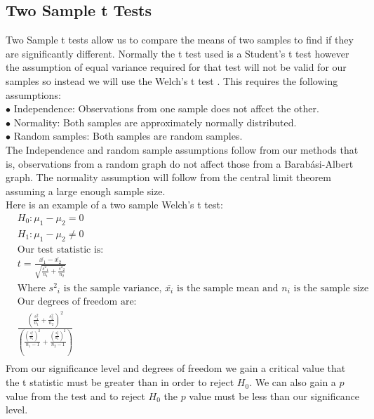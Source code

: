 \documentclass{article}
\begin{document}
        \subsection{Two Sample t Tests}
        Two Sample t tests allow us to compare the means of two samples to find if they are significantly different. Normally the t test used is a Student's t test however the assumption of equal variance required for that test will not be valid for our samples so instead we will use the Welch's t test \parencite{welch1947generalization}. This requires the following assumptions:\\
        $\bullet$ Independence: Observations from one sample does not affcet the other.\\
        $\bullet$ Normality: Both samples are approximately normally distributed.\\
        $\bullet$ Random samples: Both samples are random samples.\\
        The Independence and random sample assumptions follow from our methods that is, observations from a random graph do not affect those from a Barabási-Albert graph. The normality assumption will follow from the central limit theorem assuming a large enough sample size.\\
        Here is an example of a two sample Welch's t test:\\
        \begin{align*}
            &H_{0}: \mu_1 - \mu_2 = 0\\
            &H_{1}: \mu_1 - \mu_2 \neq  0\\
            &\text{Our test statistic is:}\\
            &t = \frac{\bar{x_1}-\bar{x_2} }{\sqrt{\frac{{s^2}_1}{n_1}+\frac{{s^2}_2}{n_2}}}\\
            &\text{Where ${s^2}_i$ is the sample variance, $\bar{x_i}$ is the sample mean and $n_i$ is the sample size}\\
            &\text{Our degrees of freedom are:}\\
            &\frac{(\frac{s^2_{1}}{n_1}+\frac{s^2_{2}}{n_2})^2}{(\frac{(\frac{s^2_{1}}{n_1})^2}{n_1-1}+\frac{(\frac{s^2_{2}}{n_2})^2}{n_2-1})}\\
        \end{align*}
        From our significance level and degrees of freedom we gain a critical value that the t statistic must be greater than in order to reject $H_0$. We can also gain a $p$ value from the test and to reject $H_0$ the $p$ value must be less than our significance level.
\end{document}
